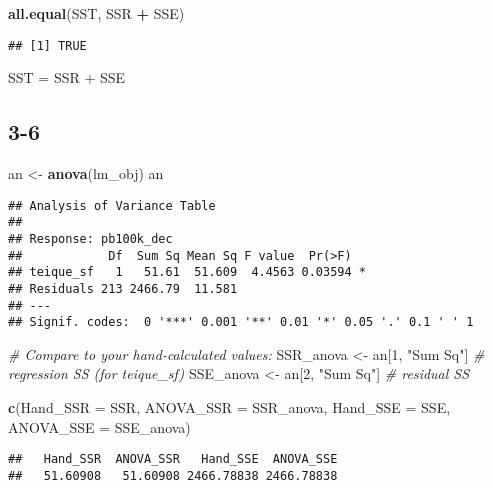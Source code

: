 \documentclass[
]{article}
\newenvironment{Shaded}{\begin{snugshade}}{\end{snugshade}}
\newcommand{\AttributeTok}[1]{\textcolor[rgb]{0.13,0.29,0.53}{#1}}
\newcommand{\CommentTok}[1]{\textcolor[rgb]{0.56,0.35,0.01}{\textit{#1}}}
\newcommand{\DecValTok}[1]{\textcolor[rgb]{0.00,0.00,0.81}{#1}}
\newcommand{\FunctionTok}[1]{\textcolor[rgb]{0.13,0.29,0.53}{\textbf{#1}}}
\newcommand{\NormalTok}[1]{#1}
\newcommand{\OtherTok}[1]{\textcolor[rgb]{0.56,0.35,0.01}{#1}}
\newcommand{\SpecialCharTok}[1]{\textcolor[rgb]{0.81,0.36,0.00}{\textbf{#1}}}
\newcommand{\StringTok}[1]{\textcolor[rgb]{0.31,0.60,0.02}{#1}}
\begin{document}
\begin{Shaded}
\begin{Highlighting}[]
\FunctionTok{all.equal}\NormalTok{(SST, SSR }\SpecialCharTok{+}\NormalTok{ SSE)}
\end{Highlighting}
\end{Shaded}

\begin{verbatim}
## [1] TRUE
\end{verbatim}

SST = SSR + SSE

\subsection{3-6}\label{section-16}

\begin{Shaded}
\begin{Highlighting}[]
\NormalTok{an }\OtherTok{\textless{}{-}} \FunctionTok{anova}\NormalTok{(lm\_obj)}
\NormalTok{an}
\end{Highlighting}
\end{Shaded}

\begin{verbatim}
## Analysis of Variance Table
## 
## Response: pb100k_dec
##            Df  Sum Sq Mean Sq F value  Pr(>F)  
## teique_sf   1   51.61  51.609  4.4563 0.03594 *
## Residuals 213 2466.79  11.581                  
## ---
## Signif. codes:  0 '***' 0.001 '**' 0.01 '*' 0.05 '.' 0.1 ' ' 1
\end{verbatim}

\begin{Shaded}
\begin{Highlighting}[]
\CommentTok{\# Compare to your hand{-}calculated values:}
\NormalTok{SSR\_anova }\OtherTok{\textless{}{-}}\NormalTok{ an[}\DecValTok{1}\NormalTok{, }\StringTok{"Sum Sq"}\NormalTok{]     }\CommentTok{\# regression SS (for teique\_sf)}
\NormalTok{SSE\_anova }\OtherTok{\textless{}{-}}\NormalTok{ an[}\DecValTok{2}\NormalTok{, }\StringTok{"Sum Sq"}\NormalTok{]     }\CommentTok{\# residual SS}

\FunctionTok{c}\NormalTok{(}\AttributeTok{Hand\_SSR =}\NormalTok{ SSR, }\AttributeTok{ANOVA\_SSR =}\NormalTok{ SSR\_anova,}
  \AttributeTok{Hand\_SSE =}\NormalTok{ SSE, }\AttributeTok{ANOVA\_SSE =}\NormalTok{ SSE\_anova)}
\end{Highlighting}
\end{Shaded}

\begin{verbatim}
##   Hand_SSR  ANOVA_SSR   Hand_SSE  ANOVA_SSE 
##   51.60908   51.60908 2466.78838 2466.78838
\end{verbatim}
\end{document}

